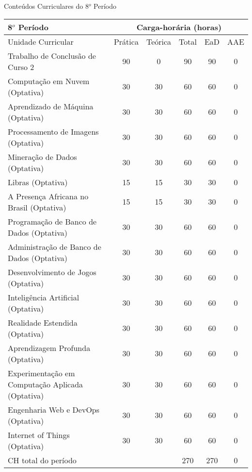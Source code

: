 \begin{quadro}[ht!]
\centering
\caption{Conteúdos Curriculares do 8$^o$ Período}\label{qua:periodo8}
\begin{tabular}{|p{8.0cm}|c|c|c|c|c|}
\hline
\rowcolor{blue1} 8$^o$ Período & \multicolumn{5}{|c|}{\centering Carga-horária (horas)} \\ \hline
\rowcolor{blue1} Unidade Curricular & Prática & Teórica & Total & EaD & AAE \\ \hline
Trabalho de Conclusão de Curso 2 & 90 & 0 & 90 & 90	&	0 \\	\hline
Computação em Nuvem (Optativa) & 30 & 30 & 60 & 60	&	0 \\	\hline
Aprendizado de Máquina (Optativa) & 30 & 30 & 60 & 60	&	0 \\	\hline
Processamento de Imagens (Optativa) & 30 & 30 & 60 & 60	&	0 \\	\hline
Mineração de Dados (Optativa) & 30 & 30 & 60 & 60	&	0 \\	\hline
Libras (Optativa) & 15 & 15 & 30 & 30	&	0 \\	\hline
A Presença Africana no Brasil (Optativa) & 15 & 15 & 30 & 30	&	0 \\	\hline
Programação de Banco de Dados (Optativa) & 30 & 30 & 60 & 60	&	0 \\	\hline
Administração de Banco de Dados (Optativa) & 30 & 30 & 60 & 60	&	0 \\	\hline
Desenvolvimento de Jogos (Optativa) & 30 & 30 & 60 & 60	&	0 \\	\hline
Inteligência Artificial (Optativa) & 30 & 30 & 60 & 60	&	0 \\	\hline
Realidade Estendida (Optativa) & 30 & 30 & 60 & 60	&	0 \\	\hline
Aprendizagem Profunda (Optativa) & 30 & 30 & 60 & 60	&	0 \\	\hline
Experimentação em Computação Aplicada (Optativa) & 30 & 30 & 60 & 60	&	0 \\	\hline
Engenharia Web e DevOps (Optativa) & 30 & 30 & 60 & 60	&	0 \\	\hline
Internet of Things (Optativa) & 30 & 30 & 60 & 60	&	0 \\	\hline
CH total do período & \multicolumn{2}{p{3.3cm}|}{\cellcolor{blue1}} & 270 & 270	&	0 \\ \hline
\end{tabular} \end{quadro}